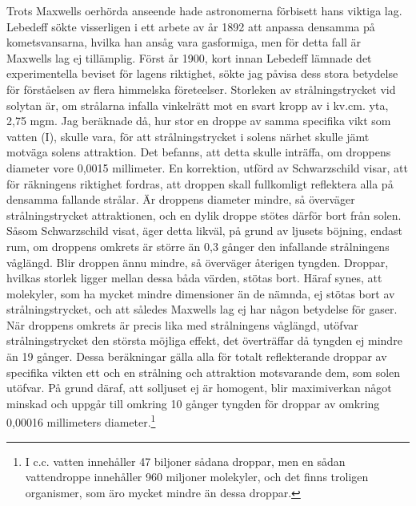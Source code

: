 \documentclass[a4paper, 12pt, oneside, swedish]{article}
\begin{document}
Trots Maxwells oerhörda anseende hade astronomerna förbisett hans viktiga lag. Lebedeff sökte visserligen i ett arbete av år 1892 att anpassa densamma på kometsvansarna, hvilka han ansåg vara gasformiga, men för detta fall är Maxwells lag ej tillämplig. Först år 1900, kort innan Lebedeff lämnade det experimentella beviset för lagens riktighet, sökte jag påvisa dess stora betydelse för förståelsen av flera himmelska företeelser. Storleken av strålningstrycket vid solytan är, om strålarna infalla vinkelrätt mot en svart kropp av i kv.cm. yta, 2,75 mgm. Jag beräknade då, hur stor en droppe av samma specifika vikt som vatten (I), skulle vara, för att strålningstrycket i solens närhet skulle jämt motväga solens attraktion. Det befanns, att detta skulle inträffa, om droppens diameter vore 0,0015 millimeter. En korrektion, utförd av Schwarzschild visar, att för räkningens riktighet fordras, att droppen skall fullkomligt reflektera alla på densamma fallande strålar. Är droppens diameter mindre, så överväger strålningstrycket attraktionen, och en dylik droppe stötes därför bort från solen. Såsom Schwarzschild visat, äger detta likväl, på grund av ljusets böjning, endast rum, om droppens omkrets är större än 0,3 gånger den infallande strålningens våglängd. Blir droppen ännu mindre, så överväger återigen tyngden. Droppar, hvilkas storlek ligger mellan dessa båda värden, stötas bort. Häraf synes, att molekyler, som ha mycket mindre dimensioner än de nämnda, ej stötas bort av strålningstrycket, och att således Maxwells lag ej har någon betydelse för gaser. När droppens omkrets är precis lika med strålningens våglängd, utöfvar strålningstrycket den största möjliga effekt, det överträffar då tyngden ej mindre än 19 gånger. Dessa beräkningar gälla alla för totalt reflekterande droppar av specifika vikten ett och en strålning och attraktion motsvarande dem, som solen utöfvar. På grund däraf, att solljuset ej är homogent, blir maximiverkan något minskad och uppgår till omkring 10 gånger tyngden för droppar av omkring 0,00016 millimeters diameter.\footnote{I c.c. vatten innehåller 47 biljoner sådana droppar, men en sådan vattendroppe innehåller 960 miljoner molekyler, och det finns troligen organismer, som äro mycket mindre än dessa droppar.}
\end{document}
